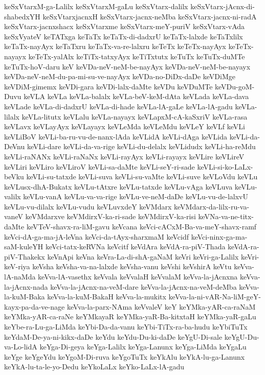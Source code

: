 {keSxVtarxM-ga-Lalilx
keSxVtarxM-gaLu
keSxVtarx-dalilx
keSxVtarx-jAcnx-di-shabedxYH
keSxVtarxjacnxH
keSxVtarx-jacnx-neMba
keSxVtarx-jacnx-ni-radA
keSxVtarx-jacnxshacx
keSxVtarxme
keSxVtarx-meY-puriV
keSxVtarx-vAda
keSxVyateV
keTATxga
keTaTx
keTaTx-di-dadxrU
keTaTx-lalxde
keTaTxlilx
keTaTx-nayAyx
keTaTxru
keTaTx-va-re-lalxru
keTeTx
keTeTx-nayAyx
keTeTx-nayayx
keTeTx-yalAlx
keTiTx-tatxyAyx
keTiTxtutx
keTuTx
keTuTx-duMTe
keTuTx-hoV-daru
keV
keVDa-neV-neM-be-nayAyx
keVDa-neV-neM-be-nayayx
keVDa-neV-neM-du-pa-mi-su-ve-nayAyx
keVDa-no-DiDx-daDe
keVDiMge
keVDiM-gimemx
keVDi-gara
keVDi-lalx-daMte
keVDu
keVDuMTe
keVDu-goM-Duvu
keVLA
keVLa
keVLa-balalx
keVLa-beV-keM-dAta
keVLada
keVLa-dava
keVLade
keVLa-di-dadxrU
keVLa-di-hade
keVLa-lA-gaLe
keVLa-lA-gadu
keVLa-lilalx
keVLa-litutx
keVLalu
keVLa-nayayx
keVLapxM-cA-kaSxriV
keVLa-rasa
keVLavx
keVLayAyx
keVLayayx
keVLeMda
keVLeMdu
keVLeY
keVLf
keVLi
keVLiBoV
keVLi-ba-ru-vu-de-nanx-lAda
keVLidA
keVLi-dAga
keVLida
keVLi-da-DeVnu
keVLi-dare
keVLi-da-va-rige
keVLi-du-delalx
keVLidudx
keVLi-ha-reMdu
keVLi-raNANx
keVLi-raNaNx
keVLi-rayAyx
keVLi-rayayx
keVLire
keVLireV
keVLiri
keVLiro
keVLiroV
keVLi-sa-daMte
keVLi-seY-ri-sade
keVLi-si-ko-LaLx-beVku
keVLi-su-tatxde
keVLi-suva
keVLi-su-vaMte
keVLi-suve
keVLoVdu
keVLu
keVLusx-dhA-Bukatx
keVLu-tAtxre
keVLu-tatxde
keVLu-vAga
keVLuva
keVLu-valilx
keVLu-vanA
keVLu-va-va-rige
keVLu-ve-neM-daDe
keVLu-vu-de-lalxvU
keVLu-vu-dilalx
keVLu-vudu
keVLuvxdeY
keVMdarx
keVMdarx-da-lilx-ru-va-vaneV
keVMdarxve
keVMdirxV-ka-ri-sade
keVMdirxV-ka-risi
keVNa-va-ne-titx-daMte
keVTeV-shavx-ra-liM-gavu
keVcana
keVci-cACxM-Ba-va-meY-shavx-ramf
keVci-dA-ga-ma-jA-leVna
keVci-da-tAyx-sharxmaM
keVcidf
keVci-ninx-ga-ma-saM-kuleYH
keVci-tatx-keRVNa
keVcitf
keVdAra
keVdA-ra-piV-Thada
keVdA-ra-piV-Thakekx
keVnApi
keVna
keVra-La-di-shA-gaNaM
keVri
keVri-ga-Lalilx
keVri-keV-riya
keVsha
keVsha-va-na-lalxde
keVsha-vanu
keVshi
keVshirA
keVtu
keVva-lA-naMda
keVva-lA-vasethx
keVvala
keVvalaH
keVvalaM
keVva-la-jAcnxna
keVva-la-jAcnx-nada
keVva-la-jAcnx-na-veM-dare
keVva-la-jAcnx-na-veM-deMba
keVva-la-kuM-Baka
keVva-la-kuM-BakaH
keVva-la-mukitx
keVva-la-ni-vAR-Na-liM-geY-kayx-pa-da-ve-nage
keVva-la-parx-NAma
keVvaleV
keY
keYMka-yAR-ca-raNaM
keYMka-yAR-ca-raNe
keYMkayaR
keYMka-yaR-Ba-kitxtaH
keYMka-yaR-gaLu
keYbe-ra-Lu-ga-LiMda
keYbi-Da-da-vanu
keYbi-TiTx-ra-ba-hudu
keYbiTuTx
keYdaM-De-ya-ni-kikx-daDe
keYdu
keYdu-Du-ki-daDe
keYgU-Di-sale
keYgU-Du-va-Lo-lidA
keYga-Di-geya
keYga-Lalilx
keYga-Lanunx
keYga-LiMda
keYgaLu
keYge
keYgeYdu
keYgoM-Di-ruva
keYgoTuTx
keYkAlu
keYkA-lu-ga-Lanunx
keYkA-lu-ta-le-yo-Dedu
keYkoLaLx
keYko-LaLx-lA-gadu
}
